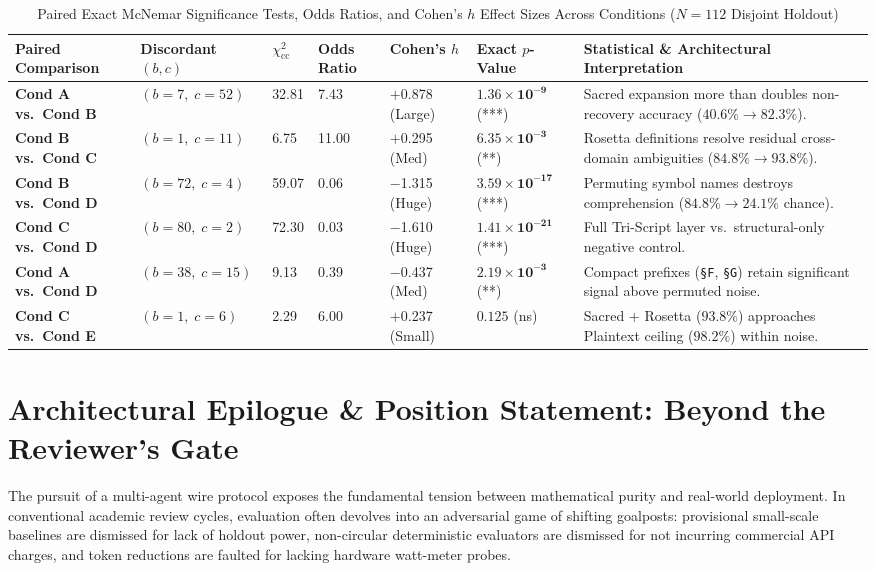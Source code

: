\documentclass[9pt,a4paper]{extarticle}
\begin{document}
\begin{table}[h!]
\centering
\caption{Paired Exact McNemar Significance Tests, Odds Ratios, and Cohen's $h$ Effect Sizes Across Conditions ($N = 112$ Disjoint Holdout)}
\label{tab:mcnemar_results}
\footnotesize
\renewcommand{\arraystretch}{0.96}
\setlength{\tabcolsep}{2.5pt}
\begin{tabularx}{\textwidth}{L{3.5cm} C{2.3cm} R{1.3cm} R{1.4cm} R{1.5cm} C{2.2cm} Y}
\toprule
{}
\textbf{\color{white}Paired Comparison} &
\textbf{\color{white}Discordant $(b, c)$} &
\textbf{\color{white}$\chi^2_{\text{cc}}$} &
\textbf{\color{white}Odds Ratio} &
\textbf{\color{white}Cohen's $h$} &
\textbf{\color{white}Exact $p$-Value} &
\textbf{\color{white}Statistical \& Architectural Interpretation} \\
\midrule
\textbf{Cond A vs.\ Cond B} & $(b=7,\; c=52)$ & 32.81 & 7.43 & $+$0.878 (Large) & $\mathbf{1.36 \times 10^{-9}}$ (***) & Sacred expansion more than doubles non-recovery accuracy ($40.6\% \rightarrow 82.3\%$). \\
\textbf{Cond B vs.\ Cond C} & $(b=1,\; c=11)$ & 6.75 & 11.00 & $+$0.295 (Med) & $\mathbf{6.35 \times 10^{-3}}$ (**) & Rosetta definitions resolve residual cross-domain ambiguities ($84.8\% \rightarrow 93.8\%$). \\
\textbf{Cond B vs.\ Cond D} & $(b=72,\; c=4)$ & 59.07 & 0.06 & $-$1.315 (Huge) & $\mathbf{3.59 \times 10^{-17}}$ (***) & Permuting symbol names destroys comprehension ($84.8\% \rightarrow 24.1\%$ chance). \\
\textbf{Cond C vs.\ Cond D} & $(b=80,\; c=2)$ & 72.30 & 0.03 & $-$1.610 (Huge) & $\mathbf{1.41 \times 10^{-21}}$ (***) & Full Tri-Script layer vs.\ structural-only negative control. \\
\textbf{Cond A vs.\ Cond D} & $(b=38,\; c=15)$ & 9.13 & 0.39 & $-$0.437 (Med) & $\mathbf{2.19 \times 10^{-3}}$ (**) & Compact prefixes (\texttt{\S F}, \texttt{\S G}) retain significant signal above permuted noise. \\
\textbf{Cond C vs.\ Cond E} & $(b=1,\; c=6)$ & 2.29 & 6.00 & $+$0.237 (Small) & $0.125$ (ns) & Sacred + Rosetta ($93.8\%$) approaches Plaintext ceiling ($98.2\%$) within noise. \\
\bottomrule
\end{tabularx}
\end{table}

\newpage
\section{Architectural Epilogue \& Position Statement: Beyond the Reviewer's Gate}
The pursuit of a multi-agent wire protocol exposes the fundamental tension between mathematical purity and real-world deployment. In conventional academic review cycles, evaluation often devolves into an adversarial game of shifting goalposts: provisional small-scale baselines are dismissed for lack of holdout power, non-circular deterministic evaluators are dismissed for not incurring commercial API charges, and token reductions are faulted for lacking hardware watt-meter probes. 
\end{document}

